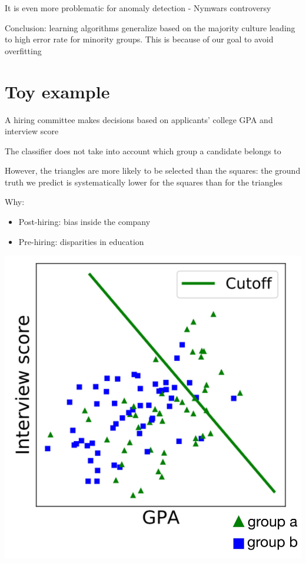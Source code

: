 \documentclass[10pt]{article}
\begin{document}
It is even more problematic for anomaly detection - Nymwars controversy

Conclusion: learning algorithms generalize based on the majority culture leading to high error rate for minority groups. This is because of our goal to avoid overfitting

\section*{Toy example}
A hiring committee makes decisions based on applicants' college GPA and interview score

The classifier does not take into account which group a candidate belongs to

However, the triangles are more likely to be selected than the squares: the ground truth we predict is systematically lower for the squares than for the triangles

Why:

\begin{itemize}
  \item Post-hiring: bias inside the company
  \item Pre-hiring: disparities in education
\end{itemize}

\begin{center}
\includegraphics[max width=\textwidth]{2024_01_08_7c1a383b1e6170f910e4g-16}
\end{center}
\end{document}
